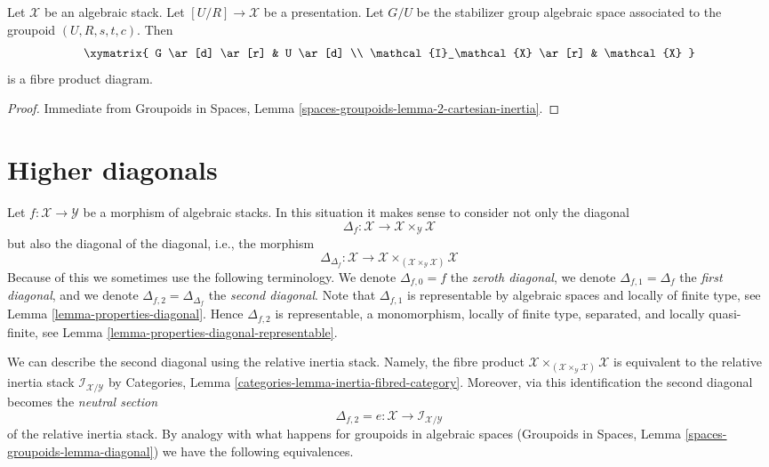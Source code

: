 \begin{lemma}
\label{lemma-presentation-inertia}
Let $\mathcal{X}$ be an algebraic stack. Let $[U/R] \to \mathcal{X}$
be a presentation. Let $G/U$ be the stabilizer group algebraic space
associated to the groupoid $(U, R, s, t, c)$. Then
$$
\xymatrix{
G \ar[d] \ar[r] & U \ar[d] \\
\mathcal{I}_\mathcal{X} \ar[r] & \mathcal{X}
}
$$
is a fibre product diagram.
\end{lemma}

\begin{proof}
Immediate from
Groupoids in Spaces, Lemma \ref{spaces-groupoids-lemma-2-cartesian-inertia}.
\end{proof}









\section{Higher diagonals}
\label{section-higher-diagonals}

\noindent
Let $f : \mathcal{X} \to \mathcal{Y}$ be a morphism of algebraic stacks.
In this situation it makes sense to consider not only the diagonal
$$
\Delta_f : \mathcal{X} \to \mathcal{X} \times_\mathcal{Y} \mathcal{X}
$$
but also the diagonal of the diagonal, i.e., the morphism
$$
\Delta_{\Delta_f} :
\mathcal{X}
\longrightarrow
\mathcal{X} \times_{(\mathcal{X} \times_\mathcal{Y} \mathcal{X})} \mathcal{X}
$$
Because of this we sometimes use the following terminology. We denote
$\Delta_{f, 0} = f$ the {\it zeroth diagonal},
we denote $\Delta_{f, 1} = \Delta_f$ the {\it first diagonal}, and
we denote $\Delta_{f, 2} = \Delta_{\Delta_f}$ the {\it second diagonal}.
Note that $\Delta_{f, 1}$ is representable by algebraic spaces and locally of
finite type, see
Lemma \ref{lemma-properties-diagonal}.
Hence $\Delta_{f, 2}$ is representable, a monomorphism, locally of finite type,
separated, and locally quasi-finite, see
Lemma \ref{lemma-properties-diagonal-representable}.

\medskip\noindent
We can describe the second diagonal using the relative inertia stack.
Namely, the fibre product
$\mathcal{X}
\times_{(\mathcal{X} \times_\mathcal{Y} \mathcal{X})} \mathcal{X}$
is equivalent to the relative inertia stack
$\mathcal{I}_{\mathcal{X}/\mathcal{Y}}$ by
Categories, Lemma \ref{categories-lemma-inertia-fibred-category}.
Moreover, via this identification the second diagonal becomes the
{\it neutral section}
$$
\Delta_{f, 2} = e : \mathcal{X} \to \mathcal{I}_{\mathcal{X}/\mathcal{Y}}
$$
of the relative inertia stack. By analogy with what happens for
groupoids in algebraic spaces
(Groupoids in Spaces, Lemma \ref{spaces-groupoids-lemma-diagonal})
we have the following equivalences.

